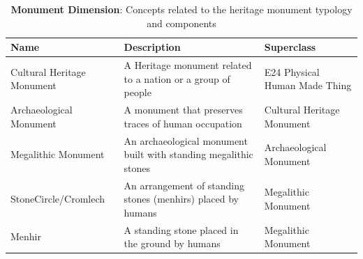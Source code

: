 \documentclass[10pt]{report}
\begin{document}
\begin{longtable}{|p{1in}|p{2.5in}|p{2.5in}|}
    \caption{\textbf{Monument Dimension}: Concepts related to the heritage monument typology and components}
    \label{tab-monument} \\
    \hline
    Name & Description & Superclass \\
    \hline \hline 
    Cultural Heritage Monument & A Heritage monument related to a nation or a group of people & E24 Physical Human Made Thing \\
    \hline 
    Archaeological Monument & A monument that preserves traces of human occupation & Cultural Heritage Monument \\
    \hline 
    Megalithic Monument & An archaeological monument built with standing megalithic stones & Archaeological Monument \\
    \hline 
    StoneCircle\slash Cromlech & An arrangement of standing stones (menhirs) placed by humans  & Megalithic Monument \\
    \hline
    Menhir & A standing stone placed in the ground by humans & Megalithic Monument \\
    \hline
\end{longtable}
\end{document}
